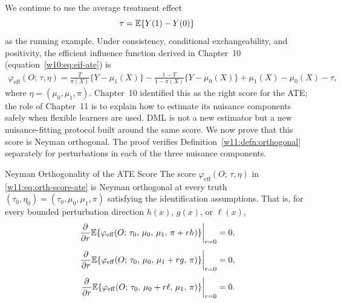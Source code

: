 \documentclass[master.tex]{subfiles}
\begin{document}
We continue to use the average treatment effect
\[
  \tau = \mathbb{E}\{Y(1) - Y(0)\}
\]
as the running example.  Under consistency, conditional
exchangeability, and positivity, the efficient influence function
derived in Chapter~10 (equation~\eqref{w10:eq:eif-ate}) is
\begin{align}
  \varphi_{\mathrm{eff}}(O;\,\tau,\eta)
  =
  \frac{T}{\pi(X)}\{Y - \mu_1(X)\}
  -
  \frac{1-T}{1-\pi(X)}\{Y - \mu_0(X)\}
  +
  \mu_1(X) - \mu_0(X) - \tau,
  \label{w11:eq:orth-score-ate}
\end{align}
where $\eta = (\mu_0, \mu_1, \pi)$.  Chapter~10 identified this as
the right score for the ATE; the role of Chapter~11 is to explain
how to estimate its nuisance components safely when flexible learners
are used.  DML is not a new estimator but a new nuisance-fitting
protocol built around the same score.  We now prove that this score
is Neyman orthogonal.  The proof verifies
Definition~\ref{w11:defn:orthogonal} separately for perturbations
in each of the three nuisance components.

\begin{lemma}{Neyman Orthogonality of the ATE Score}
\label{w11:lem:orthogonal-ate}
The score $\varphi_{\mathrm{eff}}(O;\,\tau,\eta)$ in
\eqref{w11:eq:orth-score-ate} is Neyman orthogonal at every truth
$(\tau_0, \eta_0) = (\tau_0, \mu_0, \mu_1, \pi)$ satisfying the
identification assumptions.  That is, for every bounded perturbation
direction $h(x)$, $g(x)$, or $\ell(x)$,
\begin{align*}
  \left.\frac{\partial}{\partial r}
    \mathbb{E}\!\left\{\varphi_{\mathrm{eff}}(O;\,\tau_0,\,\mu_0,\,\mu_1,\,\pi+rh)\right\}
  \right|_{r=0} &= 0, \\[4pt]
  \left.\frac{\partial}{\partial r}
    \mathbb{E}\!\left\{\varphi_{\mathrm{eff}}(O;\,\tau_0,\,\mu_0,\,\mu_1+rg,\,\pi)\right\}
  \right|_{r=0} &= 0, \\[4pt]
  \left.\frac{\partial}{\partial r}
    \mathbb{E}\!\left\{\varphi_{\mathrm{eff}}(O;\,\tau_0,\,\mu_0+r\ell,\,\mu_1,\,\pi)\right\}
  \right|_{r=0} &= 0.
\end{align*}
\end{lemma}
\end{document}
